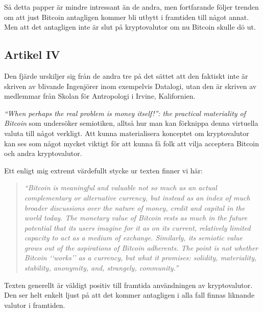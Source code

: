 \documentclass[a4paper,11pt,exjobb]{kth-mag}
\begin{document}
Så detta papper är mindre intressant än de andra, men fortfarande följer trenden om att just Bitcoin antagligen kommer bli utbytt i framtiden till något annat. Men att det antagligen inte är slut på kryptovalutor om nu Bitcoin skulle dö ut.

\subsection{Artikel IV}
\label{IV}
Den fjärde urskiljer sig från de andra tre på det sättet att den faktiskt inte är skriven av blivande Ingenjörer inom exempelvis Datalogi, utan den är skriven av medlemmar från Skolan för Antropologi i Irvine, Kalifornien.

\textit{``When perhaps the real problem is money itself!'': the practical materiality of Bitcoin}\cite{scoop1} som undersöker semiotiken, alltså hur man kan förknippa denna virtuella valuta till något verkligt. Att kunna materialisera  konceptet om kryptovalutor kan ses som något mycket viktigt för att kunna få folk att vilja acceptera Bitcoin och andra kryptovalutor. 

Ett enligt mig extremt värdefullt stycke ur texten finner vi här:
\begin{quote}
\textit{``Bitcoin is meaningful and
valuable not so much as an actual complementary or alternative currency, but
instead as an index of much broader discussions over the nature of money, credit and
capital in the world today. The monetary value of Bitcoin rests as much in the future
potential that its users imagine for it as on its current, relatively limited capacity to
act as a medium of exchange. Similarly, its semiotic value grows out of the
aspirations of Bitcoin adherents. The point is not whether Bitcoin ‘‘works’’ as a
currency, but what it promises: solidity, materiality, stability, anonymity, and,
strangely, community.''}\cite[p.263]{scoop1}
\end{quote}

Texten generellt är väldigt positiv till framtida användningen av kryptovalutor. Den ser helt enkelt ljust på att det kommer antagligen i alla fall finnas liknande valutor i framtiden.
\end{document}

